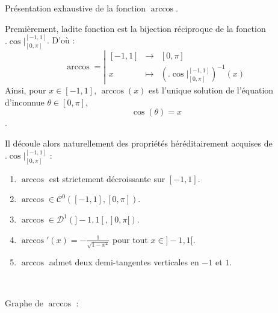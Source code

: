 \documentclass{article}
\renewenvironment{question_kholle}[2][ ]
{
	\subsection{\texorpdfstring{#2}{}}
	\notblank{#1}
	{
		\noindent #1
		\bigbreak
	}
	{}
	\begin{proof}
}
{
	\end{proof}
}
\begin{document}
\begin{question_kholle}{Présentation exhaustive de la fonction $\arccos$.}

  Premièrement, ladite fonction est la bijection réciproque de la fonction $\bigl.\cos\bigr|_{[0,\pi]}^{[-1,1]}$. D'où :
  \[
    \arccos = \left|
    \begin{array}{rcl}
      [-1,1] & \to     & [0 , \pi]                                                 \\ [1ex]
      x      & \mapsto & \left( \bigl.\cos\bigr|_{[0,\pi]}^{[-1,1]}\right)^{-1}(x)
    \end{array}
    \right.
  \]
  Ainsi, pour $x\in [-1,1]$, $\arccos (x)$ est l'unique solution de l'équation d'inconnue $\theta \in \textstyle [0 ,\pi]$, \[\cos(\theta) = x\].

  \noindent Il découle alors naturellement des propriétés héréditairement acquises de $\bigl.\cos\bigr|_{[0,\pi]}^{[-1,1]}$ :

  \begin{enumerate}
    \item $\arccos$ est strictement décroissante sur $[-1,1]$.
    \item $\arccos \in \mathcal{C}^0\left([-1,1],[0 , \pi] \right)$.
    \item $\arccos \in \mathcal{D}^1\left(]-1,1[,]0 ,\pi [ \right)$.
    \item $\displaystyle\arccos'(x) = -\frac{1}{\sqrt{1-x^2}}$ pour tout $x\in]-1,1[$.
    \item $\arccos$ admet deux demi-tangentes verticales en $-1$ et $1$.
  \end{enumerate}

  \

  Graphe de $\arccos$ :
  \begin{figure}[H]
    \centering
\end{figure}
\end{question_kholle}
\end{document}

